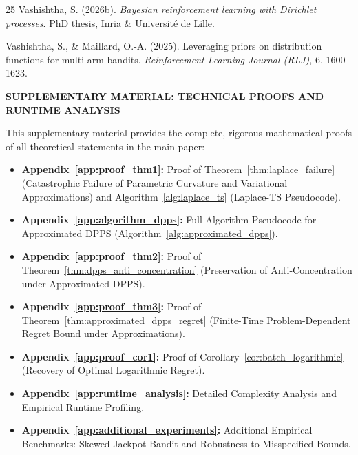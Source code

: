 \documentclass[twoside]{article}
\begin{document}
\begin{thebibliography}{25}
Vashishtha, S. (2026b).
\emph{Bayesian reinforcement learning with Dirichlet processes}.
PhD thesis, Inria \& Universit{\'e} de Lille.

Vashishtha, S., \& Maillard, O.-A. (2025).
Leveraging priors on distribution functions for multi-arm bandits.
\emph{Reinforcement Learning Journal (RLJ)}, 6, 1600--1623.

\end{thebibliography}

\clearpage
\appendix
\onecolumn
\begin{center}
{\Large \bfseries SUPPLEMENTARY MATERIAL: TECHNICAL PROOFS AND RUNTIME ANALYSIS}
\end{center}
\vspace{1.5em}

This supplementary material provides the complete, rigorous mathematical proofs of all theoretical statements in the main paper:
\begin{itemize}
    \item \textbf{Appendix~\ref{app:proof_thm1}:} Proof of Theorem~\ref{thm:laplace_failure} (Catastrophic Failure of Parametric Curvature and Variational Approximations) and Algorithm~\ref{alg:laplace_ts} (Laplace-TS Pseudocode).
    \item \textbf{Appendix~\ref{app:algorithm_dpps}:} Full Algorithm Pseudocode for Approximated DPPS (Algorithm~\ref{alg:approximated_dpps}).
    \item \textbf{Appendix~\ref{app:proof_thm2}:} Proof of Theorem~\ref{thm:dpps_anti_concentration} (Preservation of Anti-Concentration under Approximated DPPS).
    \item \textbf{Appendix~\ref{app:proof_thm3}:} Proof of Theorem~\ref{thm:approximated_dpps_regret} (Finite-Time Problem-Dependent Regret Bound under Approximations).
    \item \textbf{Appendix~\ref{app:proof_cor1}:} Proof of Corollary~\ref{cor:batch_logarithmic} (Recovery of Optimal Logarithmic Regret).
    \item \textbf{Appendix~\ref{app:runtime_analysis}:} Detailed Complexity Analysis and Empirical Runtime Profiling.
    \item \textbf{Appendix~\ref{app:additional_experiments}:} Additional Empirical Benchmarks: Skewed Jackpot Bandit and Robustness to Misspecified Bounds.
\end{itemize}
\end{document}
